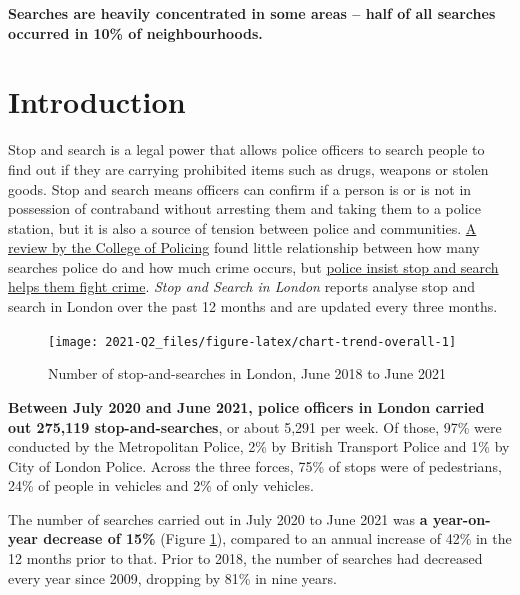 \documentclass[
  a4paper,
  twoside, 11pt]{article}
\begin{document}
\textbf{\sffamily Searches are heavily concentrated in some areas -- half of all searches occurred in 10\% of neighbourhoods.}

\hypertarget{introduction}{%
\section{Introduction}\label{introduction}}

Stop and search is a legal power that allows police officers to search people to find out if they are carrying prohibited items such as drugs, weapons or stolen goods. Stop and search means officers can confirm if a person is or is not in possession of contraband without arresting them and taking them to a police station, but it is also a source of tension between police and communities. \href{https://whatworks.college.police.uk/Research/Documents/SS_and_crime_report.pdf}{A review by the College of Policing} found little relationship between how many searches police do and how much crime occurs, but \href{https://www.met.police.uk/advice/advice-and-information/st-s/stop-and-search/why-we-use-stop-and-search/}{police insist stop and search helps them fight crime}. \emph{Stop and Search in London} reports analyse stop and search in London over the past 12 months and are updated every three months.



\begin{figure}[bh]

{\centering \texttt{[image: 2021-Q2\_files/figure-latex/chart-trend-overall-1]} 

}

\caption{Number of stop-and-searches in London, June 2018 to June 2021}\label{fig:chart-trend-overall}
\end{figure}

\textbf{Between July 2020 and June 2021, police officers in London carried out 275,119 stop-and-searches}, or about 5,291 per week. Of those, 97\% were conducted by the Metropolitan Police, 2\% by British Transport Police and 1\% by City of London Police. Across the three forces, 75\% of stops were of pedestrians, 24\% of people in vehicles and 2\% of only vehicles.

The number of searches carried out in July 2020 to June 2021 was \textbf{a year-on-year decrease of 15\%} (Figure \ref{fig:chart-trend-overall}), compared to an annual increase of 42\% in the 12 months prior to that. Prior to 2018, the number of searches had decreased every year since 2009, dropping by 81\% in nine years.
\end{document}
